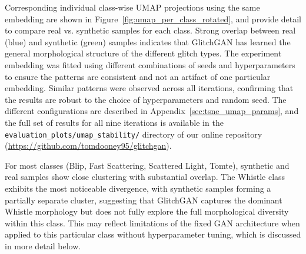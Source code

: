 \documentclass[reprint,nofootinbib,amsmath,amssymb,aps,floatfix]{revtex4-2}
\begin{document}
Corresponding individual class-wise UMAP projections using the same embedding are shown in Figure~\ref{fig:umap_per_class_rotated}, and provide detail to compare real vs. synthetic samples for each class.
Strong overlap between real (blue) and synthetic (green) samples indicates that GlitchGAN has learned the general morphological structure of the different glitch types.
The experiment embedding was fitted using different combinations of seeds and hyperparameters to ensure the patterns are consistent and not an artifact of one particular embedding. 
Similar patterns were observed across all iterations, confirming that the results are robust to the choice of hyperparameters and random seed.
The different configurations are described in Appendix~\ref{sec:tsne_umap_params}, and the full set of results for all nine iterations is available in the \texttt{evaluation\_plots/umap\_stability/} directory of our online repository (\url{https://github.com/tomdooney95/glitchgan}).




For most classes (Blip, Fast Scattering, Scattered Light, Tomte), synthetic and real samples show close clustering with substantial overlap.
The Whistle class exhibits the most noticeable divergence, with synthetic samples forming a partially separate cluster, suggesting that GlitchGAN captures the dominant Whistle morphology but does not fully explore the full morphological diversity within this class.
This may reflect limitations of the fixed GAN architecture when applied to this particular class without hyperparameter tuning, which is discussed in more detail below.

\end{document}
